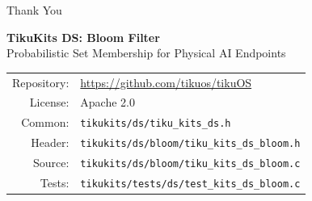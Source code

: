 \documentclass[aspectratio=169, 10pt]{beamer}
\begin{document}
\begin{frame}{Thank You}
\begin{center}
\Large\textbf{TikuKits DS: Bloom Filter}\\[0.5em]
\normalsize Probabilistic Set Membership for Physical AI Endpoints\\[1.5em]

\begin{tabular}{rl}
  Repository: & \url{https://github.com/tikuos/tikuOS} \\
  License:    & Apache 2.0 \\
  Common:     & \texttt{tikukits/ds/tiku\_kits\_ds.h} \\
  Header:     & \texttt{tikukits/ds/bloom/tiku\_kits\_ds\_bloom.h} \\
  Source:     & \texttt{tikukits/ds/bloom/tiku\_kits\_ds\_bloom.c} \\
  Tests:      & \texttt{tikukits/tests/ds/test\_kits\_ds\_bloom.c} \\
\end{tabular}
\end{center}
\end{frame}
\end{document}
